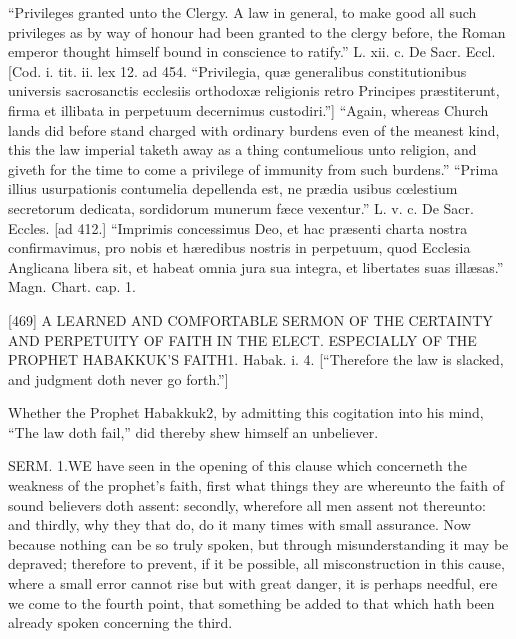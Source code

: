 “Privileges granted unto the Clergy. A law in general, to make good all such privileges as by way of honour had been granted to the clergy before, the Roman emperor thought himself bound in conscience to ratify.” L. xii. c. De Sacr. Eccl. [Cod. i. tit. ii. lex 12. ad 454. “Privilegia, quæ generalibus constitutionibus universis sacrosanctis ecclesiis orthodoxæ religionis retro Principes præstiterunt, firma et illibata in perpetuum decernimus custodiri.”] “Again, whereas Church lands did before stand charged with ordinary burdens even of the meanest kind, this the law imperial taketh away as a thing contumelious unto religion, and giveth for the time to come a privilege of immunity from such burdens.” “Prima illius usurpationis contumelia depellenda est, ne prædia usibus cœlestium secretorum dedicata, sordidorum munerum fæce vexentur.” L. v. c. De Sacr. Eccles. [ad 412.] “Imprimis concessimus Deo, et hac præsenti charta nostra confirmavimus, pro nobis et hæredibus nostris in perpetuum, quod Ecclesia Anglicana libera sit, et habeat omnia jura sua integra, et libertates suas illæsas.” Magn. Chart. cap. 1.

[469]
A LEARNED AND COMFORTABLE SERMON OF THE CERTAINTY AND PERPETUITY OF FAITH IN THE ELECT. 
ESPECIALLY OF THE PROPHET HABAKKUK’S FAITH1.
Habak. i. 4.
[“Therefore the law is slacked, and judgment doth never go forth.”]

Whether the Prophet Habakkuk2, by admitting this cogitation into his mind, “The law doth fail,” did thereby shew himself an unbeliever.

SERM. 1.WE have seen in the opening of this clause which concerneth the weakness of the prophet’s faith, first what things they are whereunto the faith of sound believers doth assent: secondly, wherefore all men assent not thereunto: and thirdly, why they that do, do it many times with small assurance. Now because nothing can be so truly spoken, but through misunderstanding it may be depraved; therefore to prevent, if it be possible, all misconstruction in this cause, where a small error cannot rise but with great danger, it is perhaps needful, ere we come to the fourth point, that something be added to that which hath been already spoken concerning the third.

